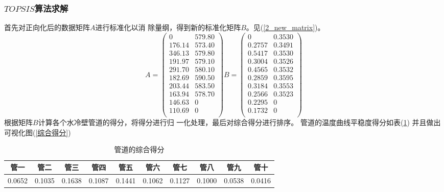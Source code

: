         \subsubsection{$TOPSIS$算法求解}
            首先对正向化后的数据矩阵$A$进行标准化以消
            除量纲，得到新的标准化矩阵$B$。见(\ref{2_new_matrix})。
            \begin{equation}
                A=\begin{pmatrix}
                    0& 579.80\\
                    176.14&	573.40\\
                    346.13&	579.80\\
                    191.97&	579.10\\
                    291.70&	580.10\\
                    182.69&	590.50\\
                    203.44&	583.50\\
                    163.94&	578.70\\
                    146.63&	0\\
                    110.69&	0\\
                \end{pmatrix}
                B=\begin{pmatrix}
                    0	  &  0.3530\\
                    0.2757&	0.3491\\
                    0.5417&	0.3530\\
                    0.3004&	0.3526\\
                    0.4565&	0.3532\\
                    0.2859&	0.3595\\
                    0.3184& 0.3553\\
                    0.2566&	0.3523\\
                    0.2295&	0\\
                    0.1732&	0\\
                \end{pmatrix}
                \label{2_new_matrix}
            \end{equation}
            根据矩阵$B$计算各个水冷壁管道的得分，将得分进行归
            一化处理，最后对综合得分进行排序。
            管道的温度曲线平稳度得分如表(\ref{score_for_temp})
            并且做出可视化图(\ref{综合得分})
            \begin{table}
                \begin{tabular}{|c|c|c|c|c|c|c|c|c|c|}
                    \hline
                    管一&管二&管三&管四&管五&管六&管七&管八&管九&管十\\
                    \hline
                    0.0652 &0.1035 &0.1638 &0.1087&0.1441
                    &0.1062&0.1127&0.1000&0.0538&0.0416\\
                    \hline
                \end{tabular}
                \caption{管道的综合得分}
                \label{score_for_temp}
            \end{table}
